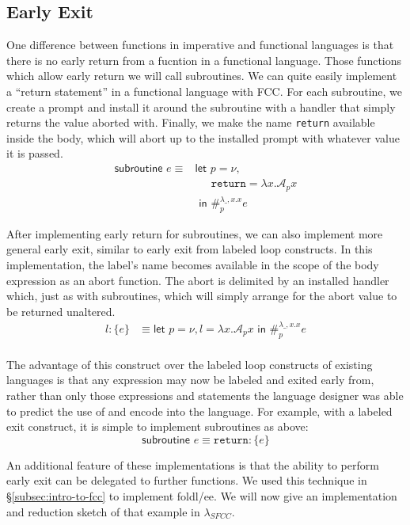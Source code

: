 \documentclass[11pt]{article}
\newcommand{\maybePage}{\newpage}
\newcommand\x{\lambda x}
\newcommand{\letin}[2]{\textsf{let }#1\textsf{ in }#2}
\newcommand\A{\mathcal{A}}
\begin{document}
\maybePage
\subsection{Early Exit}
\label{subsec:earlyExit}

One difference between functions in imperative and functional languages is that there is no early return from a fucntion in a functional language.
Those functions which allow early return we will call subroutines.
We can quite easily implement a ``return statement'' in a functional language with FCC.
For each subroutine, we create a prompt and install it around the subroutine with a handler that simply returns the value aborted with.
Finally, we make the name \texttt{return} available inside the body, which will abort up to the installed prompt with whatever value it is passed.
\begin{align*}
\textsf{subroutine }e \equiv{}
	&\letin{p=\nu, \\
	&\quad\;\, \texttt{return}=\x.\A_px \\
	&}{
	\#_p^{\lambda \_,x.x}e}
\end{align*}



After implementing early return for subroutines, we can also implement more general early exit, similar to early exit from labeled loop constructs.
In this implementation, the label's name becomes available in the scope of the body expression as an abort function.
The abort is delimited by an installed handler which, just as with subroutines, which will simply arrange for the abort value to be returned unaltered.
\begin{align*}
l\!: \{e\} &\equiv \letin{p = \nu, l = \x.\A_px}{\#_p^{\lambda \_,x.x}e} \\
\end{align*}

The advantage of this construct over the labeled loop constructs of existing languages is that any expression may now be labeled and exited early from, rather than only those expressions and statements the language designer was able to predict the use of and encode into the language.
For example, with a labeled exit construct, it is simple to implement subroutines as above:
$$\textsf{subroutine }e \equiv \texttt{return}\!:\{e\}$$





An additional feature of these implementations is that the ability to perform early exit can be delegated to further functions.
We used this technique in \S\ref{subsec:intro-to-fcc} to implement foldl/ee.
We will now give an implementation and reduction sketch of that example in $\lambda_{SFCC}$.
\end{document}
